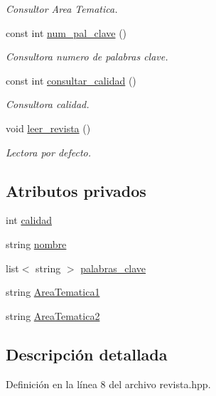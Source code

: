 \begin{DoxyCompactItemize}
\begin{DoxyCompactList}\small\item\em Consultor Area Tematica. \end{DoxyCompactList}\item 
const int \hyperlink{class_revista_ae9f679caa49af37009e53cd0bce98831}{num\-\_\-pal\-\_\-clave} ()
\begin{DoxyCompactList}\small\item\em Consultora numero de palabras clave. \end{DoxyCompactList}\item 
const int \hyperlink{class_revista_add538845ad88732d60bbd18d179bba5a}{consultar\-\_\-calidad} ()
\begin{DoxyCompactList}\small\item\em Consultora calidad. \end{DoxyCompactList}\item 
void \hyperlink{class_revista_a61178cb7b236db9a3354d5d00df1b31b}{leer\-\_\-revista} ()
\begin{DoxyCompactList}\small\item\em Lectora por defecto. \end{DoxyCompactList}\end{DoxyCompactItemize}
\subsection*{Atributos privados}
\begin{DoxyCompactItemize}
\item 
int \hyperlink{class_revista_a3771f31a8cc027b802e99e378890c818}{calidad}
\item 
string \hyperlink{class_revista_a8f33fc429436702dc5bdd6abff4ec9ac}{nombre}
\item 
list$<$ string $>$ \hyperlink{class_revista_abad6d1662e4763f4471640c8f8d5aa82}{palabras\-\_\-clave}
\item 
string \hyperlink{class_revista_ad648f3e7381a6b8d6ab218c04a222c37}{Area\-Tematica1}
\item 
string \hyperlink{class_revista_a09c823de4709bc494a3373140133ad8d}{Area\-Tematica2}
\end{DoxyCompactItemize}


\subsection{Descripción detallada}


Definición en la línea 8 del archivo revista.\-hpp.



